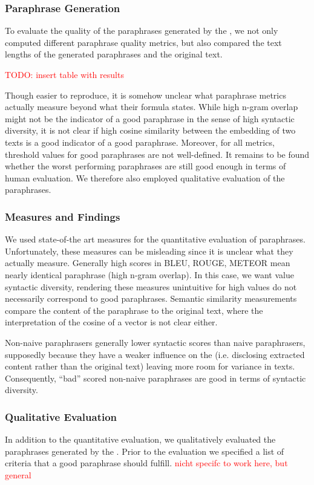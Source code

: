 \subsubsection{Paraphrase Generation}
\label{subsec:paraphrase_generation}
To evaluate the quality of the paraphrases generated by the \pgenerator{}, 
we not only computed different paraphrase quality metrics, 
but also compared the text lengths of the generated paraphrases and the original text.

\textcolor{red}{TODO: insert table with results}

Though easier to reproduce, it is somehow unclear what paraphrase metrics actually measure beyond what their formula states.
While high n-gram overlap might not be the indicator of a good paraphrase in the sense of high syntactic diversity, 
it is not clear if high cosine similarity between the embedding of two texts is a good indicator of a good paraphrase.
Moreover, for all metrics, threshold values for good paraphrases are not well-defined.
It remains to be found whether the worst performing paraphrases are still good enough in terms of human evaluation.
We therefore also employed qualitative evaluation of the paraphrases.

\subsubsection{Measures and Findings}
\label{subsec:measures_and_findings}

We used state-of-the art measures for the quantitative evaluation of paraphrases. 
Unfortunately, these measures can be misleading since it is unclear what they actually measure.
Generally high scores in BLEU, ROUGE, METEOR mean nearly identical paraphrase (high n-gram overlap).
In this case, we want value syntactic diversity, rendering these measures unintuitive 
for high values do not necessarily correspond to good paraphrases.
Semantic similarity measurements compare the content of the paraphrase to the original text, 
where the interpretation of the cosine of a vector is not clear either.

Non-naive paraphrasers generally lower syntactic scores than naive paraphrasers,
supposedly because they have a weaker influence on the \pgenerator{} 
(i.e. disclosing extracted content rather than the original text)
leaving more room for variance in texts.
Consequently, \enquote{bad} scored non-naive paraphrases are good in terms of syntactic diversity.

\subsubsection{Qualitative Evaluation}
\label{subsec:qualitative_evaluation}

In addition to the quantitative evaluation, we qualitatively evaluated the paraphrases generated by the \pgenerator{}.
Prior to the evaluation we specified a list of criteria that a good paraphrase should fulfill.
\textcolor{red}{nicht specifc to work here, but general}
